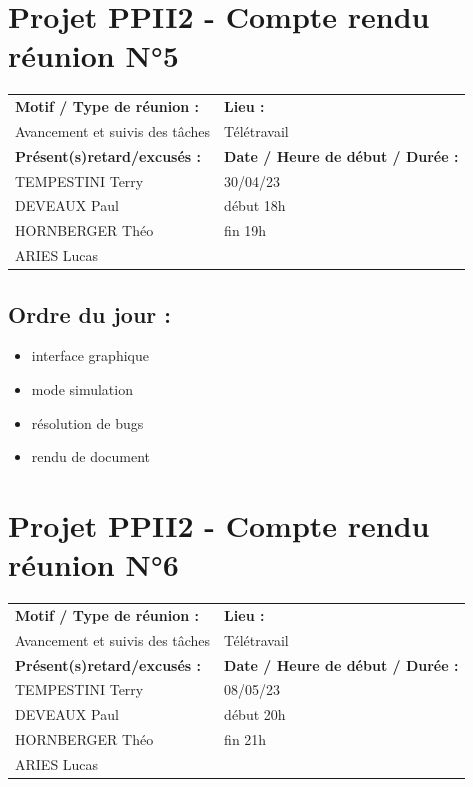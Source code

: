 \documentclass[12pt,titlepage]{report}
\begin{document}
\newpage

\section*{Projet PPII2 - Compte rendu réunion N°5}
\begin{tabular}{|p{7cm}|p{6cm}|}
    \hline
    \textbf{Motif / Type de réunion :}
    & \textbf{Lieu :}
    \\
    Avancement et suivis des tâches
    & 
    Télétravail
    \\ \hline
    \textbf{Présent(s)retard/excusés :}
    &
    \textbf{Date / Heure de début / Durée :}
    \\ 
    TEMPESTINI Terry &  30/04/23\\  
    DEVEAUX Paul & début 18h\\
    HORNBERGER Théo & fin 19h\\
    ARIES Lucas & 
    \\ \hline
\end{tabular}

\subsection*{Ordre du jour :}
\begin{itemize}
    \item{interface graphique}
    \item{mode simulation}
    \item{résolution de bugs}
    \item{rendu de document}
\end{itemize}

\newpage

\section*{Projet PPII2 - Compte rendu réunion N°6}
\begin{tabular}{|p{7cm}|p{6cm}|}
    \hline
    \textbf{Motif / Type de réunion :}
    & \textbf{Lieu :}
    \\
    Avancement et suivis des tâches
    & 
    Télétravail
    \\ \hline
    \textbf{Présent(s)retard/excusés :}
    &
    \textbf{Date / Heure de début / Durée :}
    \\ 
    TEMPESTINI Terry &  08/05/23\\  
    DEVEAUX Paul & début 20h\\
    HORNBERGER Théo & fin 21h\\
    ARIES Lucas & 
    \\ \hline
\end{tabular}
\end{document}
